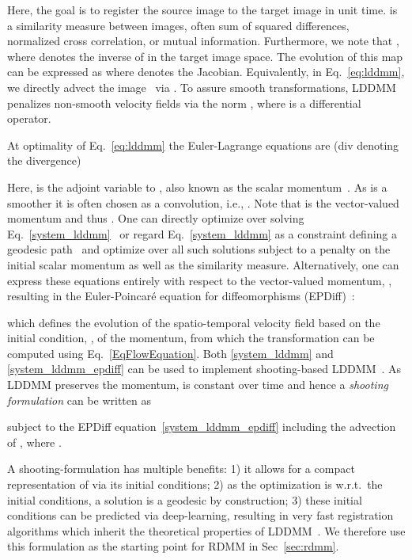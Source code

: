 \documentclass{article}
\numberwithin{equation}{section}
\newcommand{\wrt}{{w.r.t.}}
\newcommand{\ie}{{i.e.}}
\newcommand{\zy}[1]{{\color{black}{#1}}}
\begin{document}
Here, the goal is to register the source image  to the target image  in unit time.  is a similarity measure between images, often sum of squared differences, normalized cross correlation, or mutual information. Furthermore, we note that , where  denotes the inverse of  in the target image space. The evolution of this map can be expressed as  
where  denotes the Jacobian. Equivalently, in Eq.~\eqref{eq:lddmm}, we directly advect the image~\citep{hart2009optimal,vialard2012diffeomorphic} via . To assure smooth transformations, LDDMM penalizes non-smooth velocity fields via the norm , where  is a differential operator.







At optimality of Eq.~\eqref{eq:lddmm} the Euler-Lagrange equations are (div denoting the divergence)

Here,  is the adjoint variable to , also known as the scalar momentum~\citep{hart2009optimal,vialard2012diffeomorphic}. As  is a smoother it is often chosen as a convolution, \ie, . Note that  is the vector-valued momentum and thus . One can directly optimize over  solving Eq.~\eqref{system_lddmm}~\citep{beg2005computing} or regard Eq.~\eqref{system_lddmm} as a constraint defining a geodesic path~\citep{vialard2012diffeomorphic} and optimize over all such solutions subject to a penalty on the initial scalar momentum as well as the similarity measure. Alternatively, one can express \zy{\footnote{Thm.~\eqref{thm:rdmm_momentum_optimality} in suppl.~\ref{sec:optimality_conditions}  provides a more generalized derivation.}} these equations entirely with respect to the vector-valued momentum, , resulting in the Euler-Poincar\'e equation for diffeomorphisms (EPDiff)~\citep{younes2009evolutions}:

which defines the evolution of the spatio-temporal velocity field based on the initial condition, , of the momentum, from which the transformation  can be computed using Eq.~\eqref{EqFlowEquation}. 
Both \eqref{system_lddmm} and \eqref{system_lddmm_epdiff} can be used to implement shooting-based LDDMM~\citep{vialard2012diffeomorphic,singh2013vector}. As LDDMM preserves the momentum,  is constant over time and hence a {\it shooting formulation} can be written as

subject to the EPDiff equation~\eqref{system_lddmm_epdiff} including the advection of , where .

A shooting-formulation has multiple benefits: 1) it allows for a compact representation of  via its initial conditions; 2) as the optimization is \wrt~the initial conditions, a solution is a geodesic by construction; 3) these initial conditions can be predicted via deep-learning, resulting in very fast registration algorithms which inherit the theoretical properties of LDDMM~\citep{yang2017quicksilver,yang2016fast}. We therefore use this formulation as the starting point for RDMM in Sec~\ref{sec:rdmm}.
\end{document}

